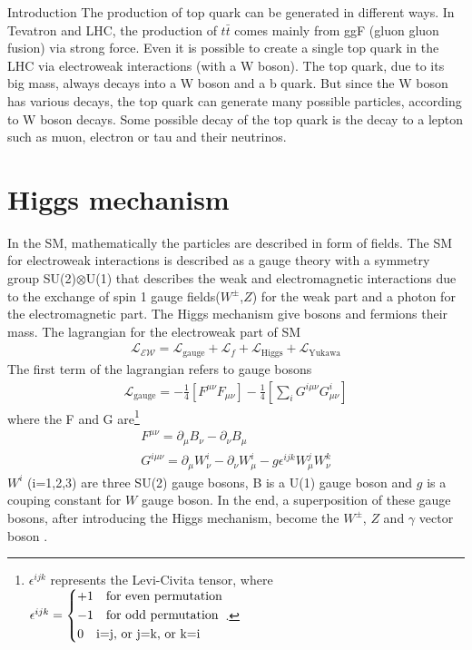 \begin{chapter}{Introduction}
The production of top quark can be generated in different ways. In Tevatron and LHC, the production of $t\bar{t}$ comes mainly from ggF (gluon gluon fusion) via strong force. Even it is possible to create a single top quark in the LHC via electroweak interactions (with a W boson)\cite{th1}. 
The top quark, due to its big mass, always decays into a W boson and a b quark. But since the W boson has various decays, the top quark can generate many possible particles, according to W boson decays. Some possible decay of the top quark is the decay to a lepton such as muon, electron or tau and their neutrinos. %

\section{Higgs mechanism}
In the SM, mathematically the particles are described in form of fields. The SM for electroweak interactions is described as a gauge theory with a symmetry group SU(2)$\otimes$U(1)
that describes the weak and electromagnetic interactions
due to the exchange of spin 1 gauge fields($W^{\pm}$,$Z$) for the weak part and a photon for the electromagnetic part. The Higgs mechanism give bosons and fermions their mass. The lagrangian for the electroweak part of SM
\begin{align}\label{sml}
\mathcal{L_{\text{EW}}}=\mathcal{L}_\text{gauge}+\mathcal{L}_f +\mathcal{L}_\text{Higgs} + \mathcal{L}_\text{Yukawa}
\end{align}
The first term of the lagrangian refers to gauge bosons 
 \begin{align}\label{smg}
 \mathcal{L}_\text{gauge}=-\frac{1}{4}\left[F^{\mu\nu}F_{\mu\nu}\right]-\frac{1}{4}\left[\sum_{i}G^{i\mu\nu}G^i_{\mu\nu}\right]
 \end{align}
where the F and G are\footnote{$\epsilon^{ijk}$ represents the Levi-Civita tensor, where $\epsilon^{ijk}= \begin{dcases}
	+1 \quad \text{for even permutation} \\
	-1 \quad \text{for odd permutation}\\
	0 \quad \text{i=j, or j=k, or k=i } 
	\end{dcases}$.} 
\begin{align}
F^{\mu \nu}=\partial_\mu B_\nu -\partial_\nu B_\mu \\
G^{i\mu\nu}=\partial_\mu W^i_\nu -\partial_\nu W^i_\mu -g\epsilon^{ijk}W^j_\mu W^k_\nu 
\end{align}
$W^i$ (i=1,2,3) are three SU(2) gauge bosons, B is a U(1) gauge boson and $g$  is a couping constant for $W$ gauge boson. In the end, a superposition of these gauge bosons, after introducing the Higgs mechanism, become the $W^\pm$, $Z$ and $\gamma$ vector boson
\cite{ew1,ew2}. %


\end{chapter}
